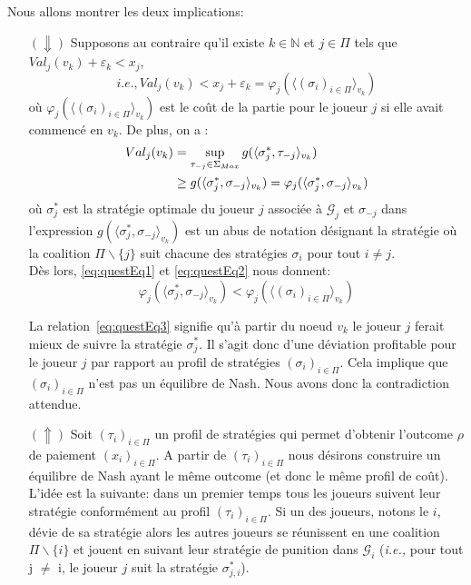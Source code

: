 \begin{demonstration}
	Nous allons montrer les deux implications:\\
	\begin{itemize}
		\item[$(\Downarrow)$] Supposons au contraire qu'il existe $k\in \mathbb{N}$ et $j\in\Pi$ tels que $Val_j(v_k) + \varepsilon_k < x_j$,
		\begin{equation}
			\label{eq:questEq1}
			i.e., Val_j(v_k) < x_j + \varepsilon_k = \varphi_j(\langle (\sigma_i)_{i \in \Pi}\rangle_{v_k})
		\end{equation}
		où $\varphi_j(\langle (\sigma_i)_{i \in \Pi}\rangle_{v_k})$ est le coût de la partie pour le joueur $j$ si elle avait commencé en $v_k$.
		De plus, on a : 
		\begin{align}
			\label{eq:questEq2}
			Val_j(v_k) &= \sup_{\tau_{-j}\in \Sigma_{Max}} g(\langle \sigma^*_j,\tau_{-j} \rangle_{v_k}) \notag\\
			           &\geq g (\langle \sigma^*_j,\sigma_{-j} \rangle_{v_k}) = \varphi_j(\langle \sigma^*_j,\sigma_{-j} \rangle_{v_k})
		\end{align}
		où $\sigma^*_j$ est la stratégie optimale du joueur $j$ associée à $\mathcal{G}_j$ et $\sigma_{-j}$ dans l'expression $g (\langle \sigma^*_j,\sigma_{-j} \rangle_{v_k})$ est un abus de notation désignant la stratégie où la coalition $\Pi\backslash\{ j \}$ suit chacune des stratégies $\sigma_i$ pour tout $i \neq j$.\\
		
		Dès lors, \eqref{eq:questEq1} et \eqref{eq:questEq2} nous donnent:
		\begin{equation}
			\label{eq:questEq3}
			\varphi_j(\langle \sigma^*_j,\sigma_{-j} \rangle_{v_k}) < \varphi_j(\langle(\sigma_i)_{i\in \Pi}\rangle_{v_k})
		\end{equation}
		
		La relation~\eqref{eq:questEq3} signifie qu'à partir du noeud $v_k$ le joueur $j$ ferait mieux de suivre la stratégie $\sigma^*_j$. Il s'agit donc d'une déviation profitable pour le joueur $j$ par rapport au profil de stratégies $(\sigma_i)_{i\in \Pi}$. Cela implique que $(\sigma_i)_{i\in\Pi}$ n'est pas un équilibre de Nash. Nous avons donc la contradiction attendue.\\
		
		\item[$(\Uparrow)$] Soit $(\tau_i)_{i\in \Pi}$ un profil de stratégies qui permet d'obtenir l'outcome $\rho$ de paiement $(x_i)_{i\in\Pi}$.
		A partir de $(\tau_i)_{i\in \Pi}$ nous désirons construire un équilibre de Nash ayant le même outcome (et donc le même profil de coût).
		L'idée est la suivante: dans un premier temps tous les joueurs suivent leur stratégie conformément au profil $(\tau_i)_{i \in \Pi}$. Si un des joueurs, notons le $i$,  dévie de sa stratégie alors les autres joueurs se réunissent en une coalition $\Pi\backslash \{ i \}$ et jouent en suivant leur stratégie de punition dans $\mathcal{G}_i$ (\emph{i.e.,} pour tout j $\neq$ i, le joueur $j$ suit la stratégie $\sigma^*_{j,i}$).\\
		

\end{itemize}
\end{demonstration}
